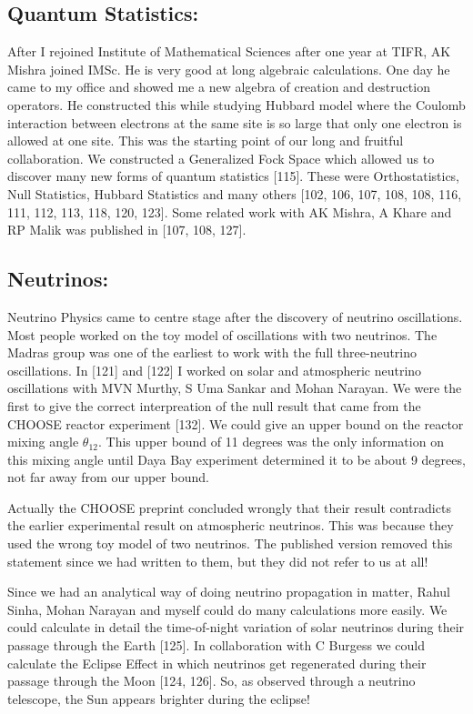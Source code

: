 \subsection*{Quantum Statistics:}
\vskip -8pt
After I rejoined Institute of Mathematical Sciences after one year at 
TIFR, AK Mishra joined IMSc. He is very good at long algebraic 
calculations. One day he came to my office and showed me a new algebra 
of creation and destruction operators. He constructed this while 
studying Hubbard model where the Coulomb interaction between electrons 
at the same site is so large that only one electron is allowed at one 
site. This was the starting point of our long and fruitful 
collaboration. We constructed a Generali\-zed Fock Space which allowed us 
to discover many new forms of quantum statistics [115]. These were 
Orthostatistics, Null Stati\-stics, Hubbard Statistics and many others 
[102, 106, 107, 108, 108, 116, 111, 112, 113, 118, 120, 123]. Some related work 
with AK Mishra, A Khare and RP Malik was published in [107, 108, 127].

\vspace{-\topsep}
\subsection*{Neutrinos:}
\vskip -8pt
Neutrino Physics came to centre stage after the discovery of neutrino 
oscillations. Most people worked on the toy model of osci\-llations with 
two neutrinos. The Madras group was one of the earliest to work with the 
full three-neutrino oscillations. In [121] and [122] I worked on solar 
and atmospheric neutrino oscillations with MVN Murthy, S Uma Sankar and 
Mohan Narayan. We were the first to give the correct interpreation of 
the null result that came from the CHOOSE reactor experiment [132]. We 
could give an upper bound on the reactor mixing angle $\theta_{12}$. This 
upper bound of 11 degrees was the only information on this mixing angle 
until Daya Bay experiment determined it to be about 9 degrees, not 
far away from our upper bound.


Actually the CHOOSE preprint concluded wrongly that their result 
contradicts the earlier experimental result on atmosphe\-ric neutrinos. 
This was because they used the wrong toy model of two neutrinos. The 
published version removed this statement since we had written to them, 
but they did not refer to us at all!

Since we had an analytical way of doing neutrino propagation in matter, 
Rahul Sinha, Mohan Narayan and myself could do many calculations more 
easily. We could calculate in detail the time-of-night variation of 
solar neutrinos during their passage through the Earth [125]. In 
collaboration with C Burgess we could calculate the Eclipse Effect in 
which neutrinos get regene\-rated during their passage through the Moon 
[124, 126]. So, as observed through a neutrino telescope, the Sun 
appears brighter during the eclipse!

